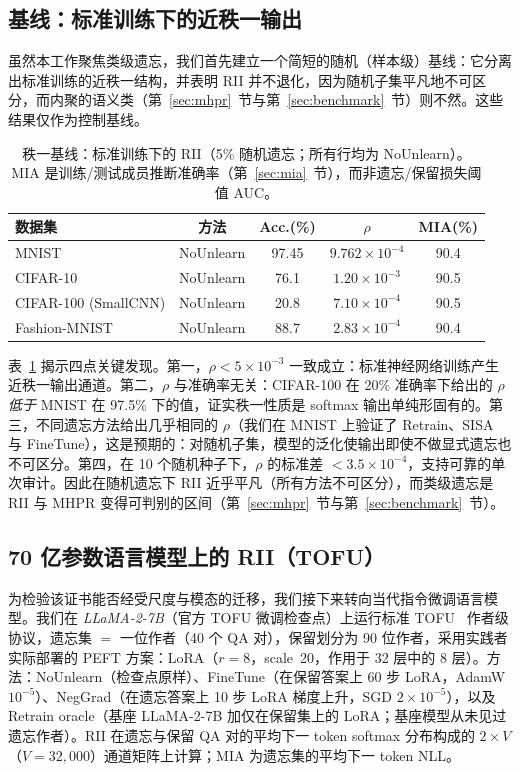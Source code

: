 \subsection{基线：标准训练下的近秩一输出}

虽然本工作聚焦类级遗忘，我们首先建立一个简短的随机（样本级）基线：它分离出标准训练的近秩一结构，并表明 RII 并不退化，因为随机子集平凡地不可区分，而内聚的语义类（第~\ref{sec:mhpr}~节与第~\ref{sec:benchmark}~节）则不然。这些结果仅作为控制基线。

\begin{table}[t]
\centering
\small
\caption{秩一基线：标准训练下的 RII（5\% 随机遗忘；所有行均为 NoUnlearn）。MIA 是训练/测试成员推断准确率（第~\ref{sec:mia}~节），而非遗忘/保留损失阈值 AUC。}\label{tab:main}
\setlength{\tabcolsep}{2pt}
\begin{tabular}{l c c c c}
\toprule
数据集 & 方法 & Acc.(\%) & $\rho$ & MIA(\%) \\
\midrule
MNIST & NoUnlearn & 97.45 & $9.762\times10^{-4}$ & 90.4 \\
\midrule
CIFAR-10 & NoUnlearn & 76.1 & $1.20\times10^{-3}$ & 90.5 \\
CIFAR-100 (SmallCNN) & NoUnlearn & 20.8 & $7.10\times10^{-4}$ & 90.5 \\
Fashion-MNIST & NoUnlearn & 88.7 & $2.83\times10^{-4}$ & 90.4 \\
\bottomrule
\end{tabular}
\end{table}

表~\ref{tab:main} 揭示四点关键发现。第一，$\rho<5\times10^{-3}$ 一致成立：标准神经网络训练产生近秩一输出通道。第二，$\rho$ 与准确率无关：CIFAR-100 在 20\% 准确率下给出的 $\rho$ \emph{低于} MNIST 在 97.5\% 下的值，证实秩一性质是 softmax 输出单纯形固有的。第三，不同遗忘方法给出几乎相同的 $\rho$（我们在 MNIST 上验证了 Retrain、SISA 与 FineTune），这是预期的：对随机子集，模型的泛化使输出即使不做显式遗忘也不可区分。第四，在 10 个随机种子下，$\rho$ 的标准差 $<3.5\times10^{-4}$，支持可靠的单次审计。因此在随机遗忘下 RII 近乎平凡（所有方法不可区分），而类级遗忘是 RII 与 MHPR 变得可判别的区间（第~\ref{sec:mhpr}~节与第~\ref{sec:benchmark}~节）。

\subsection{70 亿参数语言模型上的 RII（TOFU）}
\label{sec:llm}

为检验该证书能否经受尺度与模态的迁移，我们接下来转向当代指令微调语言模型。我们在 \emph{LLaMA-2-7B}（官方 TOFU 微调检查点）上运行标准 TOFU~\cite{maini2024tofu} 作者级协议，遗忘集 $=$ 一位作者（40 个 QA 对），保留划分为 90 位作者，采用实践者实际部署的 PEFT 方案：LoRA（$r{=}8$，scale~20，作用于 32 层中的 8 层）。方法：NoUnlearn（检查点原样）、FineTune（在保留答案上 60 步 LoRA，AdamW $10^{-5}$）、NegGrad（在遗忘答案上 10 步 LoRA 梯度上升，SGD $2{\times}10^{-5}$），以及 Retrain oracle（基座 LLaMA-2-7B 加仅在保留集上的 LoRA；基座模型从未见过遗忘作者）。RII 在遗忘与保留 QA 对的平均下一 token softmax 分布构成的 $2\times V$（$V{=}32{,}000$）通道矩阵上计算；MIA 为遗忘集的平均下一 token NLL。

